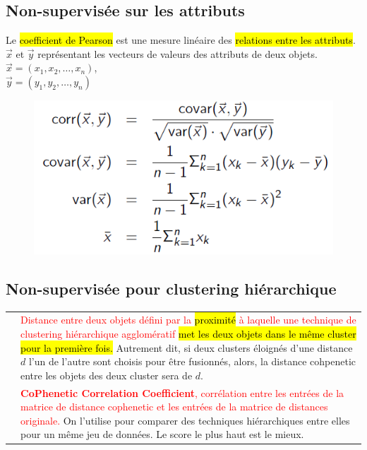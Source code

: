 \documentclass[letterpaper, 12pt]{article}
\newcommand{\red}[1]{
	\textcolor{red}{#1}}
\newcommand{\myul}[1]{
		\underline{\smash{#1}}
	}
\begin{document}
		\subsection{Non-supervisée sur les attributs}
			\begin{minipage}{0.4\textwidth}
				Le \hl{coefficient de Pearson} est une mesure
					linéaire des \hl{relations entre les attributs}.
				$\overrightarrow{x}$ et $\overrightarrow{y}$ représentant
					les vecteurs de valeurs des attributs de deux 
					objets.\\
				$\overrightarrow{x} = (x_1, x_2, \ldots, x_n)$, \\
				$\overrightarrow{y} = (y_1, y_2, \ldots, y_n)$
			\end{minipage}\hfill
			\begin{minipage}{0.55\textwidth}
				\begin{figure}[H]
					\centering
					\includegraphics[scale=0.6]{Images/pearson.png}
				\end{figure}\noindent
			\end{minipage}
		\vspace*{-0.5cm}
		\subsection{Non-supervisée pour clustering hiérarchique}
			\begin{tabular}{lp{13cm}}
				\myul{\textbf{\hl{Cophenetic distance}}} &
					\red{Distance entre deux objets défini par la 
						 \hl{proximité} à laquelle une technique de 
						 clustering hiérarchique agglomératif
						 \hl{met les deux objets dans le même cluster
						 pour la première fois.}} Autrement dit, 
						 si deux clusters éloignés d'une distance
						 $d$ l'un de l'autre sont choisis pour
						 être fusionnés, alors, la distance cohpenetic
						 entre les objets des deux cluster sera de $d$.\\
				\myul{\textbf{\hl{CPCC}}} &
					\red{\textbf{CoPhenetic Correlation Coefficient}, 
						corrélation entre les entrées de la matrice de
						 distance cophenetic et les entrées de la 
						 matrice de distances originale.} On l'utilise
						 pour comparer des techniques hiérarchiques
						 entre elles pour un même jeu de données. Le score
						 le plus haut est le mieux.
			\end{tabular}
		\vspace*{-0.5cm}
\end{document}
